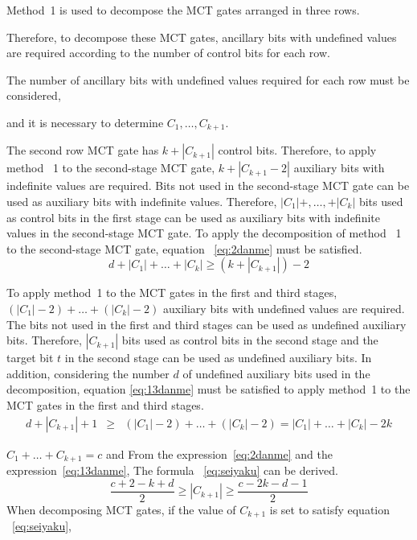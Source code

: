 \par
Method~1 is used to decompose the MCT gates arranged in three rows.

Therefore, to decompose these MCT gates,
ancillary bits with undefined values are required according to the number of control bits for each row.

The number of ancillary bits with undefined values required for each row must be considered,

and it is necessary to determine
$C_{1},\dots,C_{k+1}$.

\par
The second row MCT gate has $k+|C_{k+1}|$ control bits.
Therefore, to apply method ~1 to the second-stage MCT gate,
$k+|C_{k+1}-2|$ auxiliary bits with indefinite values are required.
Bits not used in the second-stage MCT gate can be used as auxiliary bits with indefinite values.
Therefore,
$|C_{1}|+,\dots, +|C_{k}|$ bits used as control bits in the first stage
can be used as auxiliary bits with indefinite values in the second-stage MCT gate.
To apply the decomposition of method ~1 to the second-stage MCT gate,
equation ~\ref{eq:2danme} must be satisfied.
\begin{equation}\label{eq:2danme}
d+|C_{1}|+\dots +|C_{k}|\geq (k+|C_{k+1}|)-2
\end{equation}
\par
To apply method~1 to the MCT gates in the first and third stages,
$(|C_{1}|-2)+\dots+(|C_{k}|-2)$ auxiliary bits with undefined values are required.
The bits not used in the first and third stages can be used as undefined auxiliary bits.
Therefore,
$|C_{k+1}|$ bits used as control bits in the second stage and
the target bit $t$ in the second stage can be used as undefined auxiliary bits.
In addition, considering the number $d$ of undefined auxiliary bits used in the decomposition,
equation \ref{eq:13danme} must be satisfied to apply method~1 to the MCT gates in the first and third stages.
\begin{eqnarray}\label{eq:13danme} d+|C_{k+1}|+1&\geq& (|C_{1}|-2)+\dots+(|C_{k}|-2)=|C_{1}|+\dots+|C_{k}|-2k \end{eqnarray} \par $C_{1}+\dots +C_{k+1}=c$ and From the expression~\ref{eq:2danme} and the expression~\ref{eq:13danme}, The formula ~\ref{eq:seiyaku} can be derived.
\begin{equation}\label{eq:seiyaku}
\frac{c+2-k+d}{2}\geq|C_{k+1}|\geq \frac{c-2k-d-1}{2}
\end{equation}
When decomposing MCT gates, if the value of $C_{k+1}$ is set to satisfy equation ~\ref{eq:seiyaku},
